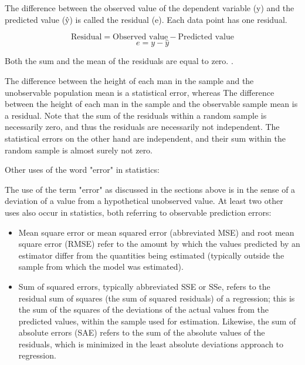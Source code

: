 \documentclass[12pt, a4paper]{report}
\theoremstyle{plain}
\theoremstyle{definition}
\theoremstyle{remark}
\begin{document}
	
	The difference between the observed value of the dependent variable (y) and the predicted value (ŷ) is called the residual (e). Each data point has one residual.
	
	\[ \mbox{Residual} = \mbox{Observed value} - \mbox{Predicted value}\]
	\[e = y - \hat{y} \]
	
	Both the sum and the mean of the residuals are equal to zero. .
	
	
	
	The difference between the height of each man in the sample and the unobservable population mean is a statistical error, whereas
	The difference between the height of each man in the sample and the observable sample mean is a residual.
	Note that the sum of the residuals within a random sample is necessarily zero, and thus the residuals are necessarily not independent. The statistical errors on the other hand are independent, and their sum within the random sample is almost surely not zero.
	
	
	Other uses of the word "error" in statistics: 
	
	The use of the term "error" as discussed in the sections above is in the sense of a deviation of a value from a hypothetical unobserved value. At least two other uses also occur in statistics, both referring to observable prediction errors:
	
	\begin{itemize}
		\item Mean square error or mean squared error (abbreviated MSE) and root mean square error (RMSE) refer to the amount by which the values predicted by an estimator differ from the quantities being estimated (typically outside the sample from which the model was estimated).
		
		\item 
		Sum of squared errors, typically abbreviated SSE or SSe, refers to the residual sum of squares (the sum of squared residuals) of a regression; this is the sum of the squares of the deviations of the actual values from the predicted values, within the sample used for estimation. Likewise, the sum of absolute errors (SAE) refers to the sum of the absolute values of the residuals, which is minimized in the least absolute deviations approach to regression.
		
	\end{itemize}
	
	
\end{document}

